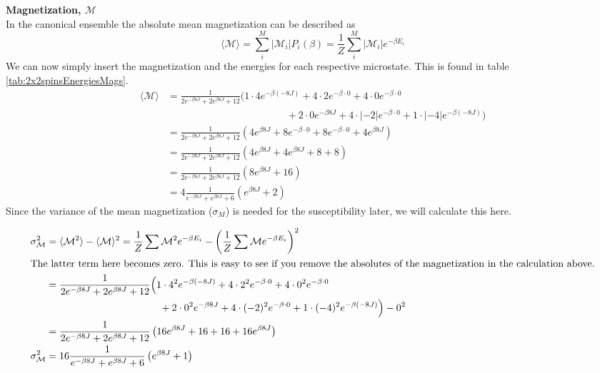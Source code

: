 \documentclass[../main.tex]{subfiles}
\begin{document}
    \textbf{Magnetization, $\mathcal{M}$}\\
    In the canonical ensemble the absolute mean magnetization can be described as
    \[\langle \mathcal{M} \rangle = \sum_i^M |\mathcal{M}_i| P_i(\beta) = \frac{1}{Z} \sum_i^M |\mathcal{M}_i| e^{-\beta E_i}\]
    We can now simply insert the magnetization and the energies for each respective microstate. This is found in table \ref{tab:2x2spinsEnergiesMags}.
    \begin{align*}
      \langle \mathcal{M} \rangle &= \frac{1}{2e^{-\beta 8J} + 2e^{\beta 8J} + 12} \Big( 1\cdot 4 e^{-\beta (-8J)} + 4 \cdot 2  e^{-\beta\cdot 0} + 4 \cdot 0e^{-\beta\cdot 0}\\
      &\hspace{5cm} + 2\cdot 0  e^{-\beta 8J} + 4 \cdot |-2| e^{-\beta \cdot 0} + 1 \cdot |-4| e^{-\beta (-8J)} \Big) \\
      &= \frac{1}{2e^{-\beta 8J} + 2e^{\beta 8J} + 12} \left(4 e^{\beta 8J} + 8e^{-\beta\cdot 0} + 8 e^{-\beta \cdot 0} +4 e^{\beta 8J} \right)\\
      &= \frac{1}{2e^{-\beta 8J} + 2e^{\beta 8J} + 12} \left( 4e^{\beta 8J} +4e^{\beta 8J} +8 +8 \right)\\
      &=\frac{1}{2e^{-\beta 8J} + 2e^{\beta 8J} + 12} \left( 8e^{\beta 8J} +16 \right)\\
      &= 4\frac{1}{e^{-\beta 8J} + e^{\beta 8J} + 6}\left( e^{\beta 8J} +2 \right)
    \end{align*}
    Since the variance of the mean magnetization ($\sigma_M$) is needed for the susceptibility later, we will calculate this here.

    \begin{align*}
      \sigma^2_\mathcal{M} &= \langle \mathcal{M}^2 \rangle - \langle \mathcal{M} \rangle ^2 = \frac{1}{Z}\sum \mathcal{M}^2 e^{-\beta E_i} - \left( \frac{1}{Z} \sum \mathcal{M} e^{-\beta E_i} \right)^2\\
      \intertext{The latter term here becomes zero. This is easy to see if you remove the absolutes of the magnetization in the calculation above.}
      &= \frac{1}{2e^{-\beta 8J} + 2e^{\beta 8J} + 12} \Big( 1\cdot 4^2 e^{-\beta (-8J)} + 4 \cdot 2^2  e^{-\beta\cdot 0} + 4 \cdot 0^2 e^{-\beta\cdot 0}\\
      &\hspace{4cm} + 2\cdot 0^2  e^{-\beta 8J} + 4 \cdot (-2)^2 e^{-\beta \cdot 0} + 1 \cdot (-4)^2 e^{-\beta (-8J)} \Big) - 0^2\\
      &=\frac{1}{2e^{-\beta 8J} + 2e^{\beta 8J} + 12} \left(16e^{\beta 8J} + 16 + 16 + 16e^{\beta 8J} \right)\\
      \sigma^2_\mathcal{M} &=16 \frac{1}{e^{-\beta 8J} + e^{\beta 8J} + 6} \left(e^{\beta 8J} + 1\right)
    \end{align*}
\end{document}
